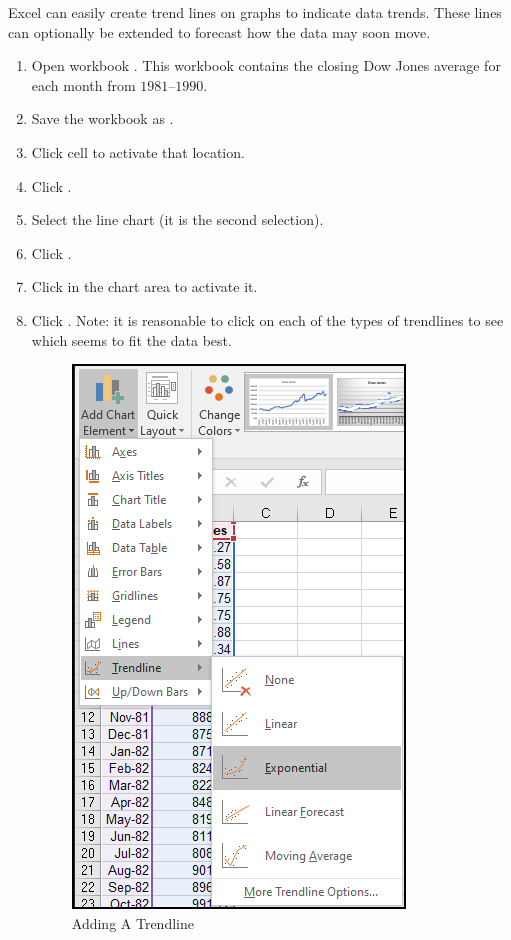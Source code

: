 Excel can easily create trend lines on graphs to indicate data trends. These lines can optionally be extended to forecast how the data may soon move.

\begin{enumerate}
	\item Open workbook . This workbook contains the closing Dow Jones average for each month from $ 1981 $–$ 1990 $.
	\item Save the workbook as .
	\item Click cell  to activate that location.
	\item Click .
	\item Select the line chart (it is the second selection).
	\item Click .
	\item Click in the chart area to activate it.
	\item Click . Note: it is reasonable to click on each of the types of trendlines to see which seems to fit the data best.

	\begin{figure}[H]
		\centering
		\includegraphics[width=\maxwidth{.50\linewidth}]{gfx/ch08_fig07}
		\caption{Adding A Trendline}
		\label{08:fig07}
	\end{figure}


\end{enumerate}
